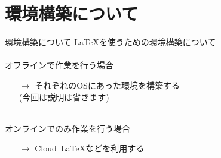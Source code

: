 \documentclass[dvipdfmx]{beamer}
\begin{document}
  \section{環境構築について}
  \begin{frame}{環境構築について}
    \Large
    \underline{LaTeXを使うための環境構築について}\\~\\
    {\large オフラインで作業を行う場合}
    \begin{enumerate}
      \item[$\rightarrow$] {\scriptsize それぞれのOSにあった環境を構築する}\\
                           {\scriptsize (今回は説明は省きます)}
    \end{enumerate}
    ~\\
    {\large オンラインでのみ作業を行う場合}
    \begin{enumerate}
      \item[$\rightarrow$]{\scriptsize Cloud~LaTeXなどを利用する}\\
    \end{enumerate}
  \end{frame}
\end{document}
